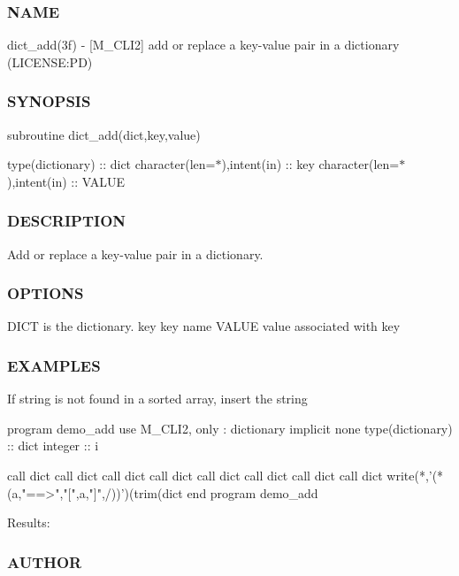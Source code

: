 \subsubsection*{N\+A\+ME}

dict\+\_\+add(3f) -\/ \mbox{[}M\+\_\+\+C\+L\+I2\mbox{]} add or replace a key-\/value pair in a dictionary (L\+I\+C\+E\+N\+SE\+:PD) 

\subsubsection*{S\+Y\+N\+O\+P\+S\+IS}

subroutine dict\+\_\+add(dict,key,value)

type(dictionary) \+:\+: dict character(len=$\ast$),intent(in) \+:\+: key character(len=$\ast$),intent(in) \+:\+: V\+A\+L\+UE

\subsubsection*{D\+E\+S\+C\+R\+I\+P\+T\+I\+ON}

Add or replace a key-\/value pair in a dictionary.

\subsubsection*{O\+P\+T\+I\+O\+NS}

D\+I\+CT is the dictionary. key key name V\+A\+L\+UE value associated with key

\subsubsection*{E\+X\+A\+M\+P\+L\+ES}

If string is not found in a sorted array, insert the string \begin{DoxyVerb}program demo_add
use M_CLI2, only : dictionary
implicit none
type(dictionary) :: dict
integer          :: i

call dict%
call dict%
call dict%
call dict%
call dict%
call dict%
call dict%
call dict%
write(*,'(*(a,"==>","[",a,"]",/))')(trim(dict%
end program demo_add
\end{DoxyVerb}


Results\+:

\subsubsection*{A\+U\+T\+H\+OR}

